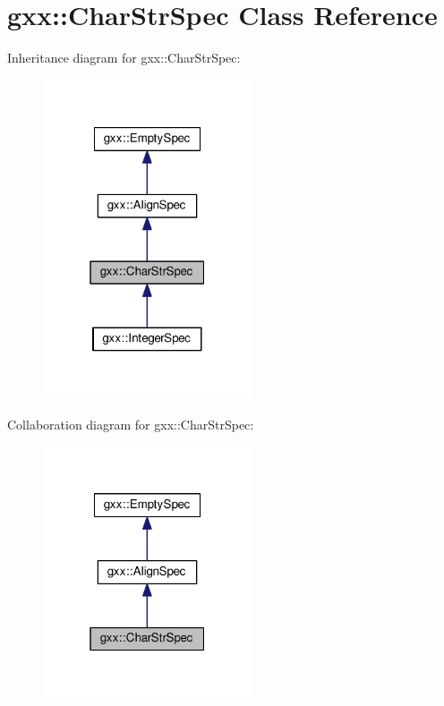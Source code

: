 \hypertarget{classgxx_1_1CharStrSpec}{}\section{gxx\+:\+:Char\+Str\+Spec Class Reference}
\label{classgxx_1_1CharStrSpec}


Inheritance diagram for gxx\+:\+:Char\+Str\+Spec\+:
\nopagebreak
\begin{figure}[H]
\begin{center}
\leavevmode
\includegraphics[width=175pt]{classgxx_1_1CharStrSpec__inherit__graph}
\end{center}
\end{figure}


Collaboration diagram for gxx\+:\+:Char\+Str\+Spec\+:
\nopagebreak
\begin{figure}[H]
\begin{center}
\leavevmode
\includegraphics[width=175pt]{classgxx_1_1CharStrSpec__coll__graph}
\end{center}
\end{figure}
